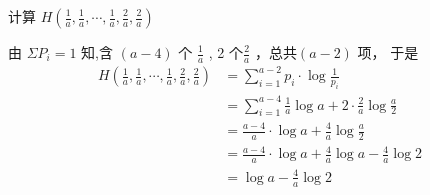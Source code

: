 \begin{tcolorbox}[breakable,colback=blue!5!white,colframe=blue!75!black,
 title=计算题]
计算 $ H\left(\frac{1}{a}, \frac{1}{a}, \cdots, \frac{1}{a}, \frac{2}{a}, \frac{2}{a}\right) $


 \tcblower
由 $ \Sigma P_{i}=1 $ 知,含 $ (a-4) $ 个 $ \frac{1}{a}$ , 2 个$ \frac{2}{a} $ ，总共$ (a-2) $ 项， 于是
$$
\begin{aligned}
H\left(\frac{1}{a}, \frac{1}{a}, \cdots, \frac{1}{a}, \frac{2}{a}, \frac{2}{a}\right) & =\sum_{i=1}^{a-2} p_{i} \cdot \log \frac{1}{p_{i}} \\
& =\sum_{i=1}^{a-4} \frac{1}{a} \log a+2 \cdot \frac{2}{a} \log \frac{a}{2} \\
& =\frac{a-4}{a} \cdot \log a+\frac{4}{a} \log \frac{a}{2} \\
& =\frac{a-4}{a} \cdot \log a+\frac{4}{a} \log a-\frac{4}{a} \log 2 \\
& =\log a-\frac{4}{a} \log 2
\end{aligned}
$$
\end{tcolorbox}



